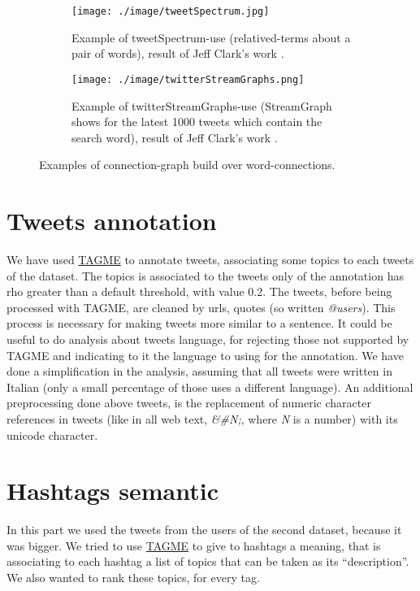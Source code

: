\documentclass[a4paper,11pt,oneside]{article}
\begin{document}
\begin{figure}[htbp]
  \begin{subfigure}[h]{\textwidth}
    \centering
    \texttt{[image: ./image/tweetSpectrum.jpg]}
    \caption{Example of tweetSpectrum-use (relatived-terms about a pair of words), result of Jeff Clark's work \cite{clark2}.}
    \label{fig:tweetSpectrum}
  \end{subfigure}
  \hspace{8mm}
  \begin{subfigure}[h]{\textwidth}
    \centering
    \texttt{[image: ./image/twitterStreamGraphs.png]}
    \caption{Example of twitterStreamGraphs-use (StreamGraph shows for the latest 1000 tweets which contain the search word), result of Jeff Clark's work \cite{clark1}.}
    \label{fig:twitterStreamGraphs}
   \end{subfigure}
   \caption{Examples of connection-graph build over word-connections.}
  \label{fig:wordsGraph}
\end{figure}


\section{Tweets annotation}
\label{sec:tagme}
We have used \href{http://tagme.di.unipi.it/}{TAGME} to annotate tweets, associating some topics to each tweets of the dataset. The topics is associated to the tweets only of the annotation has rho greater than a default threshold, with value 0.2.
The tweets, before being processed with TAGME, are cleaned by urls, quotes (so written \textit{@users}). This process is necessary for making tweets more similar to a sentence.
It could be useful to do analysis about tweets language, for rejecting those not supported by TAGME and indicating to it the language to using for the annotation.
We have done a simplification in the analysis, assuming that all tweets were written in Italian (only a small percentage of those uses a different language).
An additional preprocessing done above tweets, is the replacement of numeric character references in tweets (like in all web text, \textsl{\&\#N;}, where \textit{N} is a number) with its unicode character.


\section{Hashtags semantic}
\label{sec:hashtags}
In this part we used the tweets from the users of the second dataset, because it was bigger. We tried to use \href{http://tagme.di.unipi.it/}{TAGME} to give to hashtags a meaning, that is associating to each hashtag a list of topics that can be taken as its ``description''. We also wanted to rank these topics, for every tag.
\end{document}
